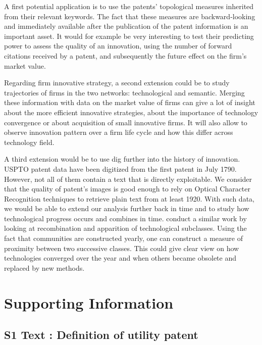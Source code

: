\documentclass[12pt,twoside,a4paper]{article}
\begin{document}
A first potential application is to use the patents' topological measures inherited from their relevant keywords. The fact that these measures are backward-looking and immediately available after the publication of the patent information is an important asset. It would for example be very interesting to test their predicting power to assess the quality of an innovation, using the number of forward citations received by a patent, and subsequently the future effect on the firm's market value. 

Regarding firm innovative strategy, a second extension could be to study trajectories of firms in the two networks: technological and semantic. Merging these information with data on the market value of firms can give a lot of insight about the more efficient innovative strategies, about the importance of technology convergence or about acquisition of small innovative firms. It will also allow to observe innovation pattern over a firm life cycle and how this differ across technology field.


A third extension would be to use dig further into the history of innovation. USPTO patent data have been digitized from the first patent in July 1790. However, not all of them contain a text that is directly exploitable. We consider that the quality of patent's images is good enough to rely on Optical Character Recognition techniques to retrieve plain text from at least 1920. With such data, we would be able to extend our analysis further back in time and to study how technological progress occurs and combines in time. \cite{akcigit2013mechanics} conduct a similar work by looking at recombination and apparition of technological subclasses.
Using the fact that communities are constructed yearly, one can construct a measure of proximity between two successive classes. This could give clear view on how technologies converged over the year and when others became obsolete and replaced by new methods.










\section*{Supporting Information \label{sectionSI}}

\subsection*{S1 Text : Definition of utility patent}
\end{document}
